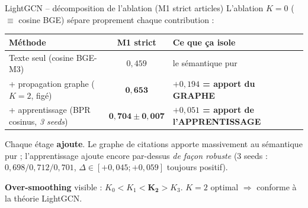 \documentclass[aspectratio=169,10pt]{beamer}
\newcommand{\keybox}[1]{%
  \begin{center}
  \colorbox{accentsoft}{\parbox{0.92\linewidth}{\centering #1}}
  \end{center}}
\begin{document}
\begin{frame}{LightGCN -- décomposition de l'ablation (M1 strict articles)}
  \footnotesize
  L'ablation $K{=}0$ ($\equiv$ cosine BGE) sépare proprement chaque contribution :

  \vspace{0.5em}
  \begin{center}\scriptsize
  \renewcommand{\arraystretch}{1.5}
  \setlength{\tabcolsep}{8pt}
  \begin{tabular}{@{}l c l@{}}
    \toprule
    \textbf{Méthode} & \textbf{M1 strict} & \textbf{Ce que ça isole} \\
    \midrule
    Texte seul (cosine BGE-M3) & $0{,}459$ & le sémantique pur \\
    \;\; + propagation graphe ($K{=}2$, figé) & $\mathbf{0{,}653}$
    & \textcolor{ok}{\textbf{$+0{,}194$ = apport du GRAPHE}} \\
    \;\;\;\; + apprentissage (BPR cosinus, \emph{3 seeds}) & $\mathbf{0{,}704 \pm 0{,}007}$
    & \textcolor{ok}{\textbf{$+0{,}051$ = apport de l'APPRENTISSAGE}} \\
    \bottomrule
  \end{tabular}
  \end{center}

  \vspace{0.6em}
  \keybox{Chaque étage \textbf{ajoute}. Le graphe de citations apporte massivement au
  sémantique pur ; l'apprentissage ajoute encore par-dessus \emph{de façon robuste}
  (3 seeds : $0{,}698 / 0{,}712 / 0{,}701$, $\Delta \in [+0{,}045 ; +0{,}059]$ toujours positif).}

  \vspace{0.4em}
  \textbf{Over-smoothing} visible : $K_0 < K_1 < \mathbf{K_2} > K_3$.
  $K{=}2$ optimal $\Rightarrow$ conforme à la théorie LightGCN.
\end{frame}
\end{document}
